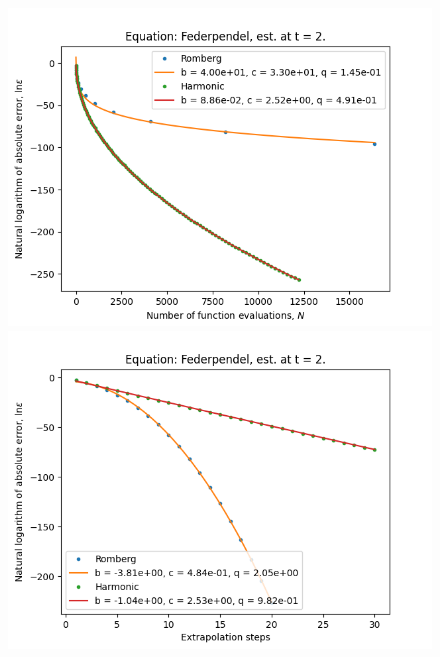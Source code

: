 \begin{figure}[H]
\centering
\begin{minipage}{0.45\textwidth}
\centering
\includegraphics[scale=0.45]{../results/emr_plots/federpendel_2_hp_trend.png}
\end{minipage}
\begin{minipage}{0.45\textwidth}
\centering
\includegraphics[scale=0.45]{../results/emr_plots/federpendel_2_hp_steps.png}
\end{minipage}
\end{figure}

